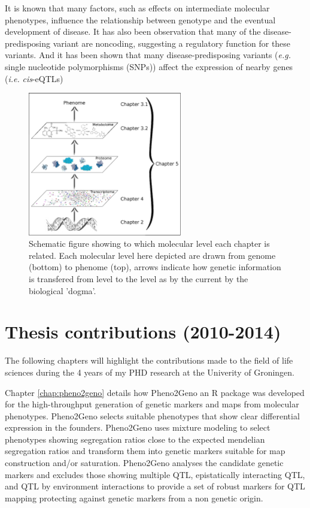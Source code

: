 It is known that many factors, such as effects on intermediate molecular phenotypes, influence 
the relationship between genotype and the eventual development of disease. It has also been 
observation that many of the disease-predisposing variant are noncoding, suggesting a regulatory 
function for these variants. And it has been shown that many disease-predisposing variants 
(\emph{e.g.} single nucleotide polymorphisms (SNPs)) affect the expression of nearby genes (\emph{i.e.} 
\emph{cis}-eQTLs)\cite{Powell:2012, Lude:2011, Zeller:2010}

\begin{figure}[h!]
 \centering
    \includegraphics[width=0.6\textwidth]{eps/image_1_3}
  \caption[ThesisLayout.]
    {Schematic figure showing to which molecular level each chapter is related. Each molecular 
    level here depicted are drawn from genome (bottom) to phenome (top), arrows indicate 
    how genetic information is transfered from level to the level as by the current by 
    the biological 'dogma'.}
    \label{fig:layout}
\end{figure}

\section{Thesis contributions (2010-2014)}
The following chapters will highlight the contributions made to the field of life 
sciences during the 4 years of my PHD research at the Univerity of Groningen.

Chapter \ref{chap:pheno2geno} details how Pheno2Geno an R package was developed for 
the high-throughput generation of genetic markers and maps from molecular phenotypes. 
Pheno2Geno selects suitable phenotypes that show clear differential expression in the founders. Pheno2Geno 
uses mixture modeling to select phenotypes showing segregation ratios close to the 
expected mendelian segregation ratios and transform them into genetic markers suitable 
for map construction and/or saturation. Pheno2Geno analyses the candidate genetic 
markers and excludes those showing multiple QTL, epistatically interacting QTL, and QTL 
by environment interactions to provide a set of robust markers for QTL mapping protecting 
against genetic markers from a non genetic origin.

